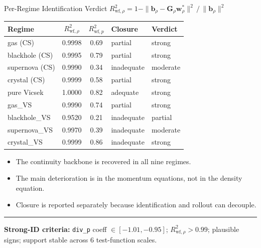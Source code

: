 \begin{frame}[shrink=32]{Per-Regime Identification Verdict}
\centering
\normalsize$R^2_{\mathrm{wf},\rho} = 1 - \|\mathbf{b}_\rho - \mathbf{G}_\rho\mathbf{w}^*_\rho\|^2\,/\,\|\mathbf{b}_\rho\|^2$\\[0.4em]
\small
\begin{tabular}{lccll}
\toprule
\textbf{Regime} & $R^2_{\mathrm{wf},\rho}$ & $R^2_{\mathrm{wf},p}$ & \textbf{Closure} & \textbf{Verdict} \\
\midrule
gas (CS)        & 0.9998 & 0.69 & \cellcolor{AccentAmber!25}partial     & \cellcolor{AccentWSINDy!25}strong   \\
blackhole (CS)  & 0.9995 & 0.79 & \cellcolor{AccentAmber!25}partial     & \cellcolor{AccentWSINDy!25}strong   \\
supernova (CS)  & 0.9990 & 0.34 & \cellcolor{AccentFail!25}inadequate   & \cellcolor{AccentAmber!30}moderate \\
crystal (CS)    & 0.9999 & 0.58 & \cellcolor{AccentAmber!25}partial     & \cellcolor{AccentWSINDy!25}strong   \\
pure Vicsek     & 1.0000 & 0.82 & \cellcolor{AccentWSINDy!25}adequate   & \cellcolor{AccentWSINDy!25}strong   \\
\midrule
gas\_VS         & 0.9990 & 0.74 & \cellcolor{AccentAmber!25}partial     & \cellcolor{AccentWSINDy!25}strong   \\
blackhole\_VS   & 0.9520 & 0.21 & \cellcolor{AccentFail!25}inadequate   & \cellcolor{AccentFail!25}partial   \\
supernova\_VS   & 0.9970 & 0.39 & \cellcolor{AccentFail!25}inadequate   & \cellcolor{AccentAmber!30}moderate \\
crystal\_VS     & 0.9999 & 0.86 & \cellcolor{AccentFail!25}inadequate   & \cellcolor{AccentWSINDy!25}strong   \\
\bottomrule
\end{tabular}

\medskip
\begin{itemize}
  \item The continuity backbone is recovered in all nine regimes.
  \item The main deterioration is in the momentum equations, not in the density equation.
  \item Closure is reported separately because identification and rollout can decouple.
\end{itemize}
\smallskip
\begin{beamercolorbox}[wd=\textwidth,sep=0.35em,rounded=true]{}%
\color{AccentWSINDy}\rule{3pt}{0.9em}\hspace{0.4em}%
\begin{minipage}[t]{0.92\textwidth}\footnotesize\color{black}
\textbf{Strong-ID criteria:}\; \texttt{div\_p} coeff $\in[-1.01,-0.95]$;\; $R^2_{\mathrm{wf},\rho}{>}0.99$;\; plausible signs;\; support stable across 6 test-function scales.
\end{minipage}
\end{beamercolorbox}
\end{frame}

